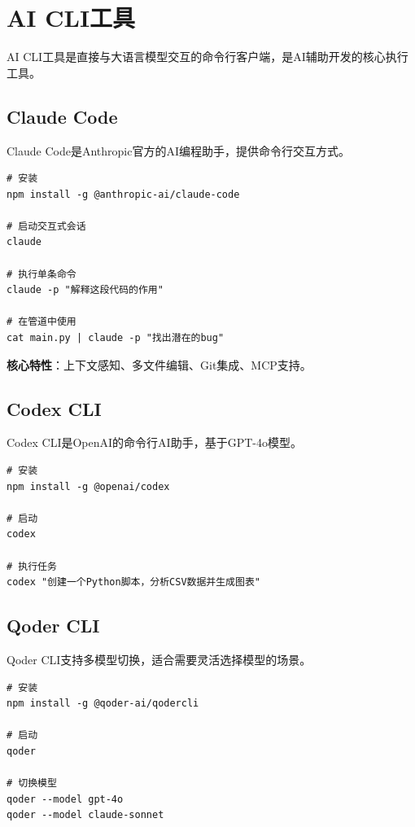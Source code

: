 \section{AI CLI工具}

AI CLI工具是直接与大语言模型交互的命令行客户端，是AI辅助开发的核心执行工具。

\subsection{Claude Code}

Claude Code是Anthropic官方的AI编程助手，提供命令行交互方式。

\begin{lstlisting}[style=shell]
# 安装
npm install -g @anthropic-ai/claude-code

# 启动交互式会话
claude

# 执行单条命令
claude -p "解释这段代码的作用"

# 在管道中使用
cat main.py | claude -p "找出潜在的bug"
\end{lstlisting}

\textbf{核心特性}：上下文感知、多文件编辑、Git集成、MCP支持。

\subsection{Codex CLI}

Codex CLI是OpenAI的命令行AI助手，基于GPT-4o模型。

\begin{lstlisting}[style=shell]
# 安装
npm install -g @openai/codex

# 启动
codex

# 执行任务
codex "创建一个Python脚本，分析CSV数据并生成图表"
\end{lstlisting}

\subsection{Qoder CLI}

Qoder CLI支持多模型切换，适合需要灵活选择模型的场景。

\begin{lstlisting}[style=shell]
# 安装
npm install -g @qoder-ai/qodercli

# 启动
qoder

# 切换模型
qoder --model gpt-4o
qoder --model claude-sonnet
\end{lstlisting}

